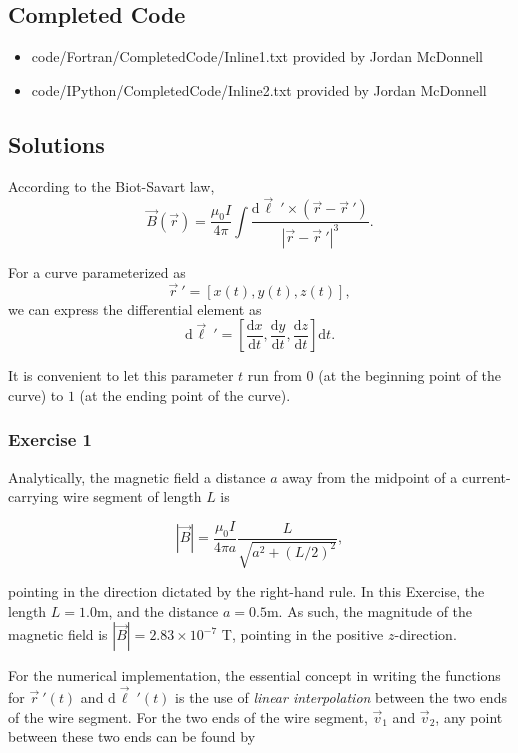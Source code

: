 \documentclass[]{article}
\providecommand{\tightlist}{%
  \setlength{\itemsep}{0pt}\setlength{\parskip}{0pt}}
\begin{document}
\subsection{Completed Code}\label{completed-code}

\begin{itemize}
\tightlist
\item
  code/Fortran/CompletedCode/Inline1.txt provided by Jordan McDonnell
\item
  code/IPython/CompletedCode/Inline2.txt provided by Jordan McDonnell
\end{itemize}

\subsection{Solutions}\label{solutions}

According to the Biot-Savart law,
\[ \vec{B}(\vec{r})=\frac{\mu_{0}I}{4\pi}\int\frac{\mathrm{d}\vec{\ell}\ ' \times\left(\vec{r}-\vec{r}\ ' \right)}{\left\vert \vec{r}-\vec{r}\ ' \right\vert ^{3}}.\]

For a curve parameterized as
\[ \vec{r}\ ' = \left\lbrack x(t), y(t), z(t)\right\rbrack , \] we can
express the differential element as
\[ \mathrm{d}\vec{\ell}\ ' = \left\lbrack \frac{\mathrm{d}x}{\mathrm{d}t}, \frac{\mathrm{d}y}{\mathrm{d}t}, \frac{\mathrm{d}z}{\mathrm{d}t} \right\rbrack \mathrm{d}t. \]

It is convenient to let this parameter \(t\) run from \(0\) (at the
beginning point of the curve) to \(1\) (at the ending point of the
curve).

\subsubsection{Exercise 1}\label{exercise-1}

Analytically, the magnetic field a distance \(a\) away from the midpoint
of a current-carrying wire segment of length \(L\) is

\[ \left\vert \vec{B} \right\vert = \frac{\mu_0 I}{4\pi a}\frac{L}{\sqrt{a^2 + (L/2)^2}}, \]

pointing in the direction dictated by the right-hand rule. In this
Exercise, the length \(L = 1.0\)m, and the distance \(a=0.5\)m. As such,
the magnitude of the magnetic field is
\(\left\vert\vec{B}\right\vert = 2.83\times 10^{-7}\) T, pointing in the
positive \(z\)-direction.

For the numerical implementation, the essential concept in writing the
functions for \(\vec{r}\ ' (t)\) and \(\mathrm{d}\vec{\ell}\ ' (t)\) is
the use of \emph{linear interpolation} between the two ends of the wire
segment. For the two ends of the wire segment, \(\vec{v}_1\) and
\(\vec{v}_2\), any point between these two ends can be found by
\end{document}

